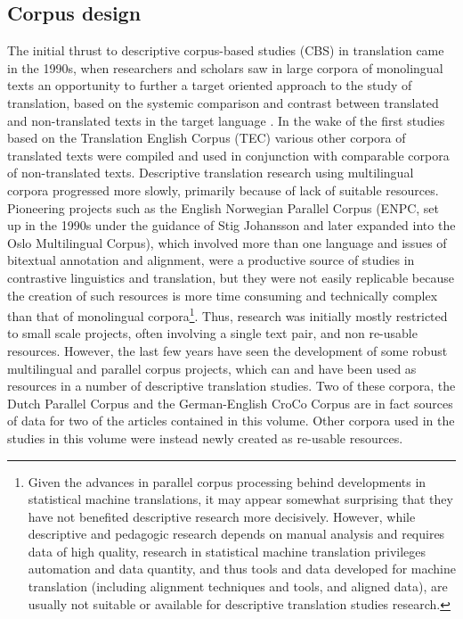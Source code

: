 \begin{refsection} 
\section{Corpus design} 
The initial thrust to descriptive corpus-based studies (CBS) in translation came in the 1990s, when researchers and scholars saw in large corpora of monolingual texts an opportunity to further a target oriented approach to the study of translation, based on the systemic comparison and contrast between translated and non-translated texts in the target language \citep{Baker1993}. In the wake of the first studies based on the Translation English Corpus (TEC) \citep{Laviosa1997} various other corpora of translated texts were compiled and used in conjunction with comparable corpora of non-translated texts. Descriptive translation research using multilingual corpora progressed more slowly, primarily because of lack of suitable resources. Pioneering projects such as the English Norwegian Parallel Corpus (ENPC, set up in the 1990s under the guidance of Stig Johansson \citep[e.g.][]{Johansson2007} and later expanded into the Oslo Multilingual Corpus), which involved more than one language and issues of bitextual annotation and alignment, were a productive source of studies in contrastive linguistics and translation, but they were not easily replicable because the creation of such resources is more time consuming and technically complex than that of monolingual corpora\footnote{Given the advances in parallel corpus processing behind developments in statistical machine translations, it may appear somewhat surprising that they have not benefited descriptive research more decisively. However, while descriptive and pedagogic research depends on manual analysis and requires data of high quality, research in statistical machine translation privileges automation and data quantity, and thus tools and data developed for machine translation (including alignment techniques and tools, and aligned data), are usually not suitable or available for descriptive translation studies research.}.  Thus, research was initially mostly restricted to small scale projects, often involving a single text pair, and non re-usable resources. However, the last few years have seen the development of some robust multilingual and parallel corpus projects, which can and have been used as resources in a number of descriptive translation studies. Two of these corpora, the Dutch Parallel Corpus \citep{Rura2008} and the German-English CroCo Corpus \citep{Hansen-Schirra2012} are in fact sources of data for two of the articles contained in this volume. Other corpora used in the studies in this volume were instead newly created as re-usable resources. 


\end{refsection}
